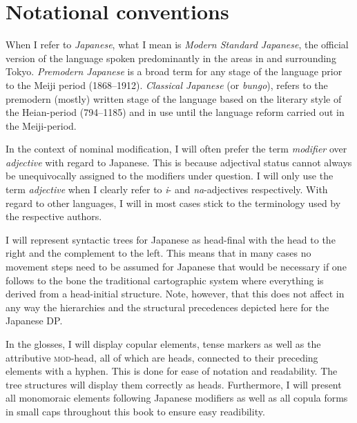 
\chapter*{Notational conventions}

When I refer to \textit{Japanese}, what I mean is \textit{Modern Standard Japanese}, the official version of the language spoken predominantly in the areas in and surrounding Tokyo. \textit{Premodern Japanese} is a broad term for any stage of the language prior to the Meiji period (1868–1912). \textit{Classical Japanese} (or \textit{bungo}), refers to the premodern (mostly) written stage of the language based on the literary style of the Heian-period (794–1185) and in use until the language reform carried out in the Meiji-period.

In the context of nominal modification, I will often prefer the term \textit{modifier} over \textit{adjective} with regard to Japanese. This is because adjectival status cannot always be unequivocally assigned to the modifiers under question. I will only use the term \textit{adjective} when I clearly refer to \textit{i}- and \textit{na}-adjectives respectively. With regard to other languages, I will in most cases stick to the terminology used by the respective authors.

I will represent syntactic trees for Japanese as head-final with the head to the right and the complement to the left. This means that in many cases no movement steps need to be assumed for Japanese that would be necessary if one follows to the bone the traditional cartographic system where everything is derived from a head-initial structure. Note, however, that this does not affect in any way the hierarchies and the structural precedences depicted here for the Japanese DP.

In the glosses, I will display copular elements, tense markers as well as the attributive \textsc{mod}-head, all of which are heads, connected to their preceding elements with a hyphen. This is done for ease of notation and readability. The tree structures will display them correctly as heads. Furthermore, I will present all monomoraic elements following Japanese modifiers as well as all copula forms in small caps throughout this book to ensure easy readibility.

